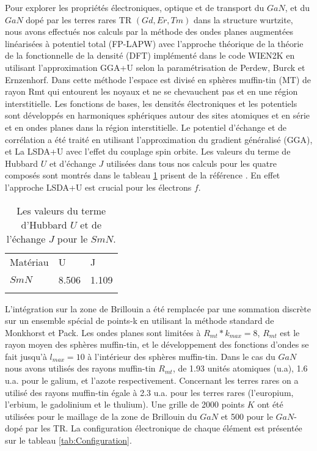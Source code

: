 Pour explorer les propriétés électroniques, optique  et de transport du $ GaN $, et du $ GaN $ dopé par les terres rares TR $ (Gd, Er, Tm) $ dans la structure wurtzite, nous avons effectués nos calculs par la méthode des ondes planes augmentées linéarisées à potentiel total (FP-LAPW) avec l'approche théorique de la théorie de la fonctionnelle de la densité (DFT) implémenté dans le code WIEN2K en utilisant l'approximation GGA+U selon la paramétrisation de Perdew, Burck et Ernzenhorf. Dans cette méthode l’espace est divisé en sphères muffin-tin (MT) de rayon Rmt qui entourent les noyaux et ne se chevauchent pas et en une région interstitielle. Les fonctions de bases, les densités électroniques et les potentiels sont développés en harmoniques sphériques autour des sites atomiques et en série et en ondes planes dans la région interstitielle. Le potentiel d’échange et de corrélation a été traité en utilisant l’approximation du gradient généralisé (GGA), et La LSDA+U avec l'effet du couplage spin orbite. Les valeurs du terme de Hubbard $ U $ et d’échange $ J $ utilisées dans tous nos calculs pour les quatre composés sont montrés dans le tableau \ref{Hubbard} prisent de la référence \cite{c10-02}. En effet l'approche LSDA+U est crucial pour les électrons $ f $.
\begin{table}
	\centering
	\begin{tabular}{lll}
		\hline\noalign{\smallskip}
		Matériau & U & J  \\
		\noalign{\smallskip}\hline\noalign{\smallskip}
		$ SmN $ & 8.506 & 1.109 \\
		
		\noalign{\smallskip}\hline
	\end{tabular}
	\caption{Les valeurs du terme d’Hubbard $ U $ et de l’échange $ J $ pour le $ SmN $.}
	\label{Hubbard}  
\end{table} 
L’intégration sur la zone de Brillouin a été remplacée par une sommation discrète sur un ensemble spécial de points-k en utilisant la méthode standard de Monkhorst et Pack. Les ondes planes sont limitées à $ R_{mt}*k_{max} = 8 $, $ R_{mt} $ est le rayon moyen des sphères muffin-tin, et le développement des fonctions d’ondes se fait jusqu’à $ l_{max}=10 $ à l’intérieur des sphères muffin-tin. Dans le cas du $ GaN $ nous avons utilisés des rayons muffin-tin $ R_{mt} $, de 1.93 unités atomiques (u.a), 1.6 u.a. pour le galium, et l’azote respectivement. Concernant les terres rares on a utilisé des rayons muffin-tin égale à 2.3 u.a. pour les terres rares (l’europium, l’erbium, le gadolinium et le thulium). Une grille de 2000 points $ K $ ont été utilisées pour le maillage de la zone de Brillouin du $ GaN $ et 500 pour le $ GaN $-dopé par les TR. La configuration électronique de chaque élément est présentée sur le tableau \ref{tab:Configuration}.
